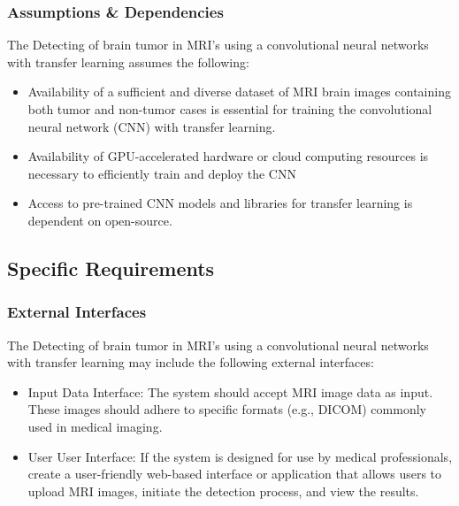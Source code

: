 \subsubsection{Assumptions \& Dependencies}
The Detecting of brain tumor in MRI’s using a
convolutional neural networks with transfer
learning assumes the following:
\begin{itemize}
    \item  Availability of a sufficient and diverse dataset of MRI brain images containing both tumor and non-tumor cases is essential for training the convolutional neural network (CNN) with transfer learning.
    \item Availability of GPU-accelerated hardware or cloud computing resources is necessary to efficiently train and deploy the CNN
    \item Access to pre-trained CNN models and libraries  for transfer learning is dependent on open-source.
\end{itemize}

\subsection{Specific Requirements}
\subsubsection{External Interfaces}
The Detecting of brain tumor in MRI’s using a
convolutional neural networks with transfer
learning may include the following external interfaces:
\begin{itemize}
    \item Input Data Interface: The system should accept MRI image data as input. These images should adhere to specific formats (e.g., DICOM) commonly used in medical imaging.
    \item User User Interface: If the system is designed for use by medical professionals, create a user-friendly web-based interface or application that allows users to upload MRI images, initiate the detection process, and view the results.
\end{itemize}

